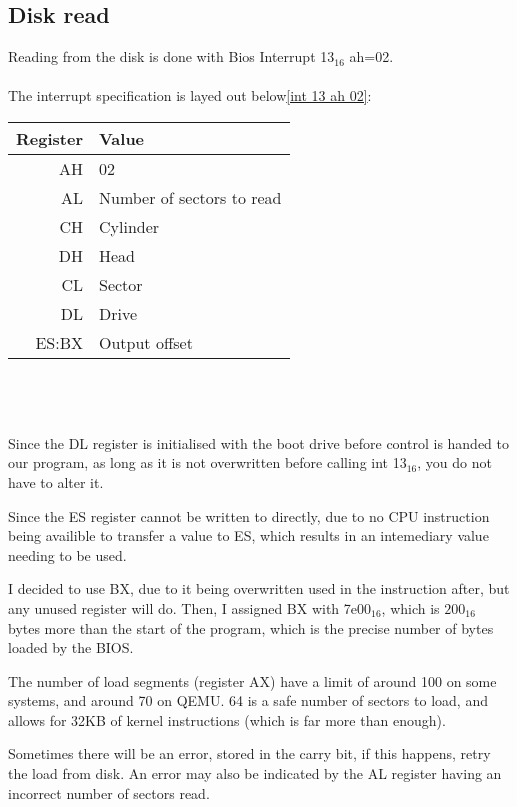 \documentclass{article}
\begin{document}
\subsection{Disk read}

Reading from the disk is done with Bios Interrupt 13$_{16}$ ah=02\cite{int 13h}.
\\\\
The interrupt specification is layed out below\ref{int 13 ah 02}:
\\

\begin{tabular}{|r|l|}
	\hline
	\textbf{Register} & \textbf{Value} \\
	\hline
	AH & 02 \\
	\hline
	AL & Number of sectors to read \\
	\hline
	CH & Cylinder \\
	\hline
	DH & Head \\
	\hline
	CL & Sector \\
	\hline
	DL & Drive \\
	\hline
	ES:BX & Output offset \\
	\hline
\end{tabular}
\\\\\\
Since the DL register is initialised with the boot drive before control
is handed to our program\cite{boot drive init}, as long as it is not
overwritten before calling int 13$_{16}$, you do not have to alter it.

Since the ES register cannot be written to directly, due to no CPU instruction
being availible to transfer a value to ES\cite{segment cpu write instruction},
which results in an intemediary value needing to be used.

I decided to use BX, due to it being overwritten used in the instruction after,
but any unused register will do. Then, I assigned BX with 7e00$_{16}$, which is
$200_{16}$ bytes more than the start of the program\cite{7c00}, which is the
precise number of bytes loaded by the BIOS\cite{sector size}.

The number of load segments (register AX)\cite{int 13h} have a limit of around 100
on some systems, and around 70 on QEMU. 64 is a safe number of sectors to load,
and allows for 32KB of kernel instructions (which is far more than enough).

Sometimes there will be an error, stored in the carry bit\cite{int 13h}, if this
happens, retry the load from disk. An error may also be indicated by the AL register
having an incorrect number of sectors read.
\end{document}
